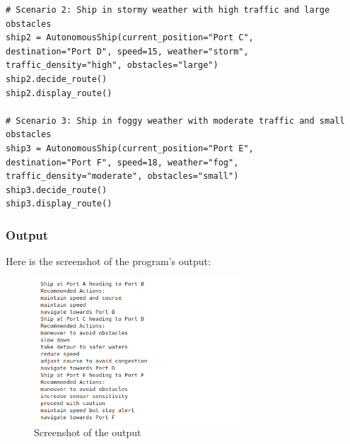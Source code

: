\documentclass{article}
\begin{document}
\begin{verbatim}
# Scenario 2: Ship in stormy weather with high traffic and large obstacles
ship2 = AutonomousShip(current_position="Port C", 
destination="Port D", speed=15, weather="storm", traffic_density="high", obstacles="large")
ship2.decide_route()
ship2.display_route()

# Scenario 3: Ship in foggy weather with moderate traffic and small obstacles
ship3 = AutonomousShip(current_position="Port E",
destination="Port F", speed=18, weather="fog", traffic_density="moderate", obstacles="small")
ship3.decide_route()
ship3.display_route()
\end{verbatim}

\subsubsection{Output}
Here is the screenshot of the program's output:
\begin{figure}[h!]
    \centering
    \includegraphics[width=0.7\textwidth]{2_c.png} 
    \caption{Screenshot of the output}
\end{figure}
\end{document}
